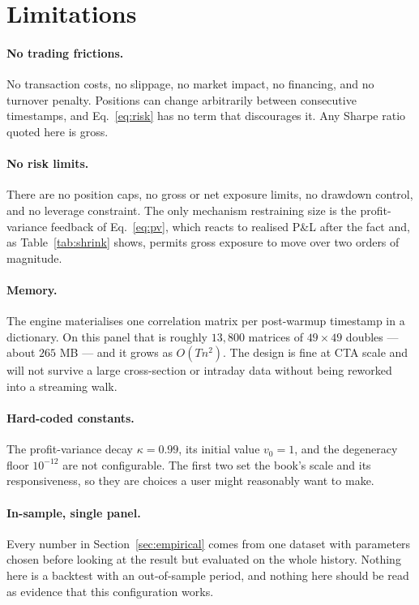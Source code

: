 \documentclass[11pt,a4paper]{article}
\begin{document}
\section{Limitations}

\paragraph{No trading frictions.} No transaction costs, no slippage, no market
impact, no financing, and no turnover penalty. Positions can change arbitrarily
between consecutive timestamps, and Eq.~\eqref{eq:risk} has no term that
discourages it. Any Sharpe ratio quoted here is gross.

\paragraph{No risk limits.} There are no position caps, no gross or net exposure
limits, no drawdown control, and no leverage constraint. The only mechanism
restraining size is the profit-variance feedback of Eq.~\eqref{eq:pv}, which
reacts to realised P\&L after the fact and, as Table~\ref{tab:shrink} shows,
permits gross exposure to move over two orders of magnitude.

\paragraph{Memory.} The engine materialises one correlation matrix per
post-warmup timestamp in a dictionary. On this panel that is roughly $13{,}800$
matrices of $49 \times 49$ doubles --- about $265$ MB --- and it grows as $O(T
n^2)$. The design is fine at CTA scale and will not survive a large
cross-section or intraday data without being reworked into a streaming walk.

\paragraph{Hard-coded constants.} The profit-variance decay $\kappa = 0.99$, its
initial value $v_0 = 1$, and the degeneracy floor $10^{-12}$ are not
configurable. The first two set the book's scale and its responsiveness, so they
are choices a user might reasonably want to make.

\paragraph{In-sample, single panel.} Every number in
Section~\ref{sec:empirical} comes from one dataset with parameters chosen before
looking at the result but evaluated on the whole history. Nothing here is a
backtest with an out-of-sample period, and nothing here should be read as
evidence that this configuration works.
\end{document}
